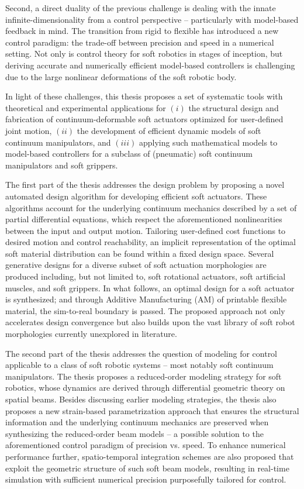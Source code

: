 Second, a direct duality of the previous challenge is dealing with the innate infinite-dimensionality from a control perspective -- particularly with model-based feedback in mind. The transition from rigid to flexible has introduced a new control paradigm: the trade-off between precision and speed in a numerical setting. Not only is control theory for soft robotics in stages of inception, but deriving accurate and numerically efficient model-based controllers is challenging due to the large nonlinear deformations of the soft robotic body.

In light of these challenges, this thesis proposes a set of systematic tools with theoretical and experimental applications for $(i)$ the structural design and fabrication of continuum-deformable soft actuators optimized for user-defined joint motion, $(ii)$ the development of efficient dynamic models of soft continuum manipulators, and $(iii)$ applying such mathematical models to model-based controllers for a subclass of (pneumatic) soft continuum manipulators and soft grippers.

The first part of the thesis addresses the design problem by proposing a novel automated design algorithm for developing efficient soft actuators. These algorithms account for the underlying continuum mechanics described by a set of partial differential equations, which respect the aforementioned nonlinearities between the input and output motion. Tailoring user-defined cost functions to desired motion and control reachability, an implicit representation of the optimal soft material distribution can be found within a fixed design space. Several generative designs for a diverse subset of soft actuation morphologies are produced including, but not limited to, soft rotational actuators, soft artificial muscles, and soft grippers. In what follows, an optimal design for a soft actuator is synthesized; and through Additive Manufacturing (AM) of printable flexible material, the sim-to-real boundary is passed. The proposed approach not only accelerates design convergence but also builds upon the vast library of soft robot morphologies currently unexplored in literature.

The second part of the thesis addresses the question of modeling for control applicable to a class of soft robotic systems -- most notably soft continuum manipulators. The thesis proposes a reduced-order modeling strategy for soft robotics, whose dynamics are derived through differential geometric theory on spatial beams. Besides discussing earlier modeling strategies, the thesis also proposes a new strain-based parametrization approach that ensures the structural information and the underlying continuum mechanics are preserved when synthesizing the reduced-order beam models -- a possible solution to the aforementioned control paradigm of precision vs. speed. To enhance numerical performance further, spatio-temporal integration schemes are also proposed that exploit the geometric structure of such soft beam models, resulting in real-time simulation with sufficient numerical precision purposefully tailored for control.

